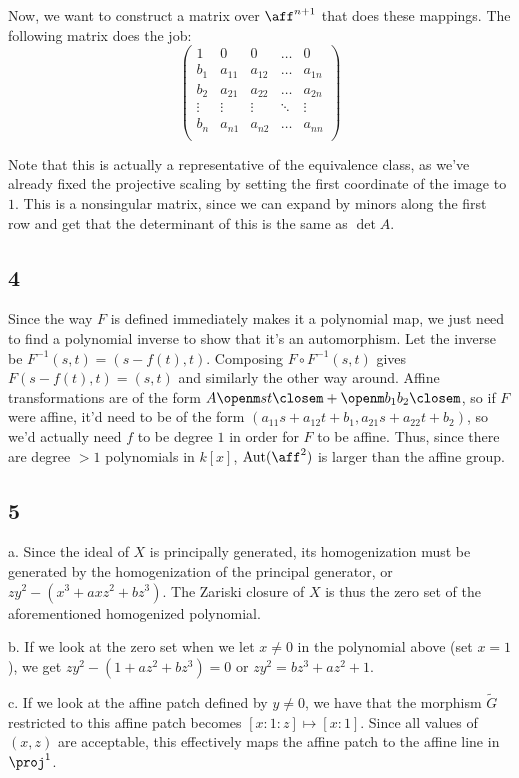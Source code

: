 \documentclass{article}
\begin{document}
Now, we want to construct a matrix over $\aff^{n+1}$ that does these mappings. The following matrix does the job:
$$
\begin{pmatrix}
    1&0&0&\hdots&0\\
  b_1&a_{11}&a_{12}&\hdots&a_{1n}\\
  b_2&a_{21}&a_{22}&\hdots&a_{2n}\\
    \vdots&\vdots&\vdots&\ddots&\vdots\\
  b_n&a_{n1}&a_{n2}&\hdots&a_{nn}\\
\end{pmatrix}
$$

Note that this is actually a representative of the equivalence class, as we've already fixed the projective scaling by setting the first coordinate of the image to $1$. This is a nonsingular matrix, since we can expand by minors along the first row and get that the determinant of this is the same as $\det A$. 
\subsection*{4}
Since the way $F$ is defined immediately makes it a polynomial map, we just need to find a polynomial inverse to show that it's an automorphism. Let the inverse be $F^{-1}(s,t)=(s-f(t),t)$. Composing $F\circ F^{-1}(s,t)$ gives $F(s-f(t),t)=(s,t)$ and similarly the other way around. Affine transformations are of the form $A\openm s\\t\closem+\openm b_1\\b_2\closem$, so if $F$ were affine, it'd need to be of the form $(a_{11}s+a_{12}t+b_1,a_{21}s+a_{22}t+b_2)$, so we'd actually need $f$ to be degree $1$ in order for $F$ to be affine. Thus, since there are degree $>1$ polynomials in $k[x]$, $\text{Aut}(\aff^2)$ is larger than the affine group.
\subsection*{5}
a. Since the ideal of $X$ is principally generated, its homogenization must be generated by the homogenization of the principal generator, or $zy^2-(x^3+axz^2+bz^3)$. The Zariski closure of $X$ is thus the zero set of the aforementioned homogenized polynomial.

\noindent b. If we look at the zero set when we let $x\neq0$ in the polynomial above (set $x=1$), we get $zy^2-(1+az^2+bz^3)=0$ or $zy^2=bz^3+az^2+1$. 

\noindent c. If we look at the affine patch defined by $y\neq0$, we have that the morphism $\tilde{G}$ restricted to this affine patch becomes $[x:1:z]\mapsto[x:1]$. Since all values of $(x,z)$ are acceptable, this effectively maps the affine patch to the affine line in $\proj^1$. 
\end{document}
